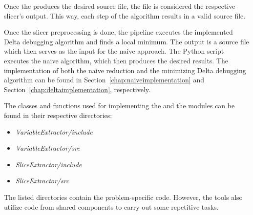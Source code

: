 Once the  produces the desired source file, the file 
is considered the respective slicer's output.
This way, each step of the algorithm results in a valid source file.

Once the slicer preprocessing is done, the pipeline executes the implemented 
Delta debugging algorithm and finds a local minimum. 
The output is a source file which then serves as the input for the naive 
approach.
The Python script executes the naive algorithm, which then produces the 
desired results.
The implementation of both the naive reduction and the minimizing Delta 
debugging algorithm can be found in Section~\ref{chap:naiveimplementation} 
and Section~\ref{chap:deltaimplementation}, respectively.

The classes and functions used for implementing 
the  and the  modules can be 
found in their respective directories:
\begin{itemize}
  \item \emph{VariableExtractor/include}
  \item \emph{VariableExtractor/src}
  \item \emph{SliceExtractor/include}
  \item \emph{SliceExtractor/src}
\end{itemize}
The listed directories contain the problem-specific code. 
However, the tools also utilize code from shared components to carry out 
some repetitive tasks.